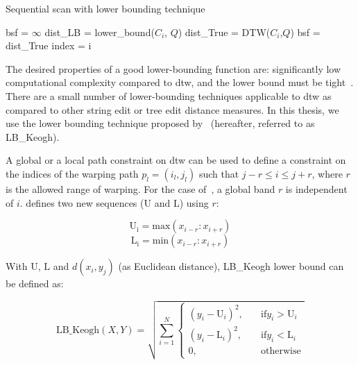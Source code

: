 \begin{algorithm}
	\caption{Sequential scan with lower bounding technique}
	\label{alg:sequential_scan_lower_bound}
	\begin{algorithmic}
		\State bsf = $\infty$	
			\State dist\_LB = lower\_bound($C_i$, $Q$)
				\State dist\_True = DTW($C_i$,$Q$)	
					\State bsf = dist\_True
					\State index = i 
				\EndIf
			\EndIf
		
		\EndFor
		
	\end{algorithmic}
\end{algorithm}

The desired properties of a good lower-bounding function are: significantly low computational complexity compared to \gls{dtw}, and the lower bound must be tight~\citep{Keogh2004}. There are a small number of lower-bounding techniques applicable to \gls{dtw} as compared to other string edit or tree edit distance measures. In this thesis, we use the lower bounding technique proposed by~\cite{Keogh2004} (hereafter, referred to as LB\_Keogh). 

A global or a local path constraint on \gls{dtw} can be used to define a constraint on the indices of the warping path $p_l = (i_l, j_l)$ such that $j-r \leq i \leq j+r$, where $r$ is the allowed range of warping. For the case of~\citep{Sakoe78TASLP}, a global band $r$ is independent of $i$. \cite{Keogh2004} defines two new sequences ($\mathrm{U}$ and $\mathrm{L}$) using $r$:

\begin{equation}
	\mathrm{U_i} = \mathrm{max}(x_{i-r}:x_{i+r})
\end{equation}
\begin{equation}
\mathrm{\mathrm{L}_i} = \mathrm{min}(x_{i-r}:x_{i+r})
\end{equation}

With $\mathrm{U}$, $\mathrm{L}$ and $d(x_i, y_j)$ (as Euclidean distance), LB\_Keogh lower bound can be defined as:

\begin{equation}
	\mathrm{LB\_Keogh}(X,Y) = \sqrt{\sum_{i=1}^{N}{\begin{cases}
			(y_i - \mathrm{U}_i)^2, & \quad \text{if} y_i > \mathrm{U}_i\\
			(y_i - \mathrm{L}_i)^2, & \quad \text{if} y_i < \mathrm{L}_i\\			
			0, & \quad \mathrm{otherwise}			
			\end{cases}}}
\end{equation}

